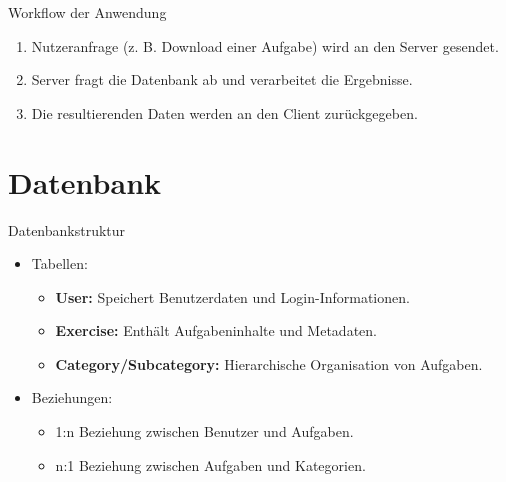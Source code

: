 \documentclass{beamer}
\newcommand{\centfig}[2]{\begin{center}
  \texttt{[image: \#2]}
  \end{center}}
\begin{document}
\begin{frame}{Workflow der Anwendung}
    \begin{enumerate}
        \item<1-> Nutzeranfrage (z. B. Download einer Aufgabe) wird an den Server gesendet.
        \item<2-> Server fragt die Datenbank ab und verarbeitet die Ergebnisse.
        \item<3-> Die resultierenden Daten werden an den Client zurückgegeben.
    \end{enumerate}
\end{frame}

\section{Datenbank}
\begin{frame}{Datenbankstruktur}
    \begin{itemize}
        \item<1-> Tabellen:
        \begin{itemize}
            \item \textbf{User:} Speichert Benutzerdaten und Login-Informationen.
            \item \textbf{Exercise:} Enthält Aufgabeninhalte und Metadaten.
            \item \textbf{Category/Subcategory:} Hierarchische Organisation von Aufgaben.
        \end{itemize}
        \item<2-> Beziehungen:
        \begin{itemize}
            \item 1:n Beziehung zwischen Benutzer und Aufgaben.
            \item n:1 Beziehung zwischen Aufgaben und Kategorien.
        \end{itemize}
    \end{itemize}
\end{frame}

\end{document}
